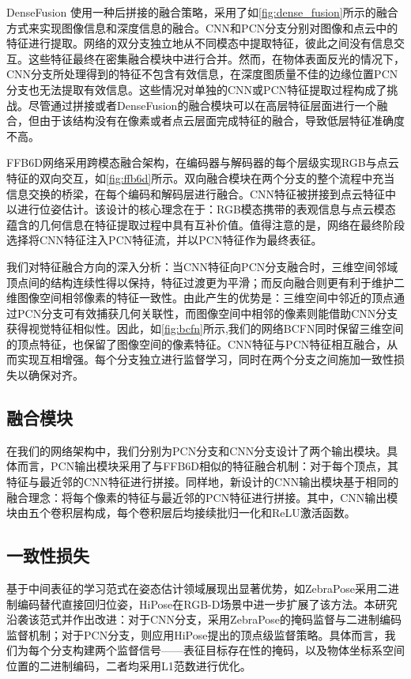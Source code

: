 DenseFusion\cite{wang2019densefusion} 使用一种后拼接的融合策略，采用了如\autoref{fig:dense_fusion}所示的融合方式来实现图像信息和深度信息的融合。CNN和PCN分支分别对图像和点云中的特征进行提取。网络的双分支独立地从不同模态中提取特征，彼此之间没有信息交互。这些特征最终在密集融合模块中进行合并。然而，在物体表面反光的情况下，CNN分支所处理得到的特征不包含有效信息，在深度图质量不佳的边缘位置PCN分支也无法提取有效信息。这些情况对单独的CNN或PCN特征提取过程构成了挑战。尽管通过拼接或者DenseFusion的融合模块可以在高层特征层面进行一个融合，但由于该结构没有在像素或者点云层面完成特征的融合，导致低层特征准确度不高。

FFB6D网络采用跨模态融合架构，在编码器与解码器的每个层级实现RGB与点云特征的双向交互，如\autoref{fig:ffb6d}所示。双向融合模块在两个分支的整个流程中充当信息交换的桥梁，在每个编码和解码层进行融合。CNN特征被拼接到点云特征中以进行位姿估计。该设计的核心理念在于：RGB模态携带的表观信息与点云模态蕴含的几何信息在特征提取过程中具有互补价值。值得注意的是，网络在最终阶段选择将CNN特征注入PCN特征流，并以PCN特征作为最终表征。

我们对特征融合方向的深入分析：当CNN特征向PCN分支融合时，三维空间邻域顶点间的结构连续性得以保持，特征过渡更为平滑；而反向融合则更有利于维护二维图像空间相邻像素的特征一致性。由此产生的优势是：三维空间中邻近的顶点通过PCN分支可有效捕获几何关联性，而图像空间中相邻的像素则能借助CNN分支获得视觉特征相似性。因此，如\autoref{fig:bcfn}所示,我们的网络BCFN同时保留三维空间的顶点特征，也保留了图像空间的像素特征。CNN特征与PCN特征相互融合，从而实现互相增强。每个分支独立进行监督学习，同时在两个分支之间施加一致性损失以确保对齐。

\subsection{融合模块}

\par 在我们的网络架构中，我们分别为PCN分支和CNN分支设计了两个输出模块。具体而言，PCN输出模块采用了与FFB6D相似的特征融合机制：对于每个顶点，其特征与最近邻的CNN特征进行拼接。同样地，新设计的CNN输出模块基于相同的融合理念：将每个像素的特征与最近邻的PCN特征进行拼接。其中，CNN输出模块由五个卷积层构成，每个卷积层后均接续批归一化和ReLU激活函数。

\subsection{一致性损失}

\par 基于中间表征的学习范式在姿态估计领域展现出显著优势，如ZebraPose\cite{su2022zebrapose}采用二进制编码替代直接回归位姿，HiPose\cite{2024hipose}在RGB-D场景中进一步扩展了该方法。本研究沿袭该范式并作出改进：对于CNN分支，采用ZebraPose的掩码监督与二进制编码监督机制；对于PCN分支，则应用HiPose提出的顶点级监督策略。具体而言，我们为每个分支构建两个监督信号——表征目标存在性的掩码，以及物体坐标系空间位置的二进制编码，二者均采用L1范数进行优化。

